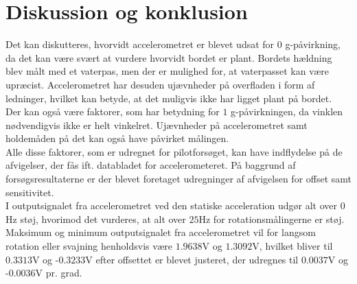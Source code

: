\section{Diskussion og konklusion}
Det kan diskutteres, hvorvidt accelerometret er blevet udsat for $0$ g-påvirkning, da det kan være svært at vurdere hvorvidt bordet er plant. Bordets hældning blev målt med et vaterpas, men der er mulighed for, at vaterpasset kan være upræcist. Accelerometret har desuden ujævnheder på overfladen i form af ledninger, hvilket kan betyde, at det muligvis ikke har ligget plant på bordet. \\
Der kan også være faktorer, som har betydning for $1$ g-påvirkningen, da vinklen nødvendigvis ikke er helt vinkelret. Ujævnheder på accelerometret samt holdemåden på det kan også have påvirket målingen. \\
Alle disse faktorer, som er udregnet for pilotforsøget, kan have indflydelse på de afvigelser, der fås ift. databladet for accelerometeret. På baggrund af forsøgsresultaterne er der blevet foretaget udregninger af afvigelsen for offset samt sensitivitet.\\

\noindent I outputsignalet fra accelerometret ved den statiske acceleration udgør alt over $0$Hz støj, hvorimod det vurderes, at alt over $25$Hz for rotationsmålingerne er støj. Maksimum og minimum outputsignalet fra accelerometret vil for langsom rotation eller svajning henholdsvis være $1.9638$V og $1.3092$V, hvilket bliver til $0.3313$V og -$0.3233$V efter offsettet er blevet justeret, der udregnes til $0.0037$V og -$0.0036$V pr. grad. \\ \clearpage